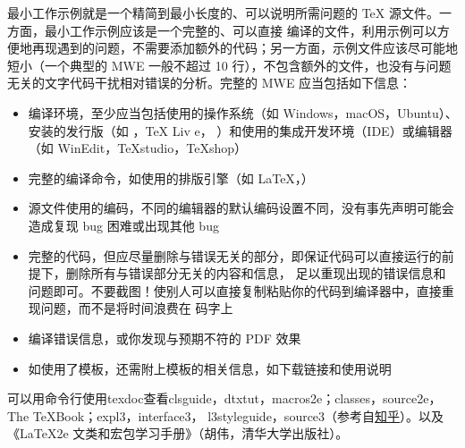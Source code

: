 最小工作示例就是一个精简到最小长度的、可以说明所需问题的 \TeX{} 源文件。一方面，最小工作示例应该是一个完整的、可以直接
编译的文件，利用示例可以方便地再现遇到的问题，不需要添加额外的代码；另一方面，示例文件应该尽可能地短小（一个典型的 MWE 
一般不超过 10 行），不包含额外的文件，也没有与问题无关的文字代码干扰相对错误的分析。完整的 MWE 应当包括如下信息：
\begin{itemize}
  \item 编译环境，至少应当包括使用的操作系统（如 Windows，macOS，Ubuntu）、安装的发行版（如 \CTeX{}，\TeX{} Liv
  e，\MacTeX{} ）和使用的集成开发环境（IDE）或编辑器（如 WinEdit，TeXstudio，TeXshop）
  \item 完整的编译命令，如使用的排版引擎（如 \LaTeX{}，\XeLaTeX{}）
  \item 源文件使用的编码，不同的编辑器的默认编码设置不同，没有事先声明可能会造成复现 bug 困难或出现其他 bug
  \item 完整的代码，但应尽量删除与错误无关的部分，即保证代码可以直接运行的前提下，删除所有与错误部分无关的内容和信息，
  足以重现出现的错误信息和问题即可。不要截图！使别人可以直接复制粘贴你的代码到编译器中，直接重现问题，而不是将时间浪费在
  码字上
  \item 编译错误信息，或你发现与预期不符的 PDF 效果
  \item 如使用了模板，还需附上模板的相关信息，如下载链接和使用说明
\end{itemize}



可以用命令行使用texdoc查看clsguide，dtxtut，macros2e；classes，source2e，The TeXBook；expl3，interface3，
l3styleguide，source3（参考自\href{https://www.zhihu.com/question/27017364}{知乎}）。以及《\LaTeX{2e} 
文类和宏包学习手册》（胡伟，清华大学出版社）。


